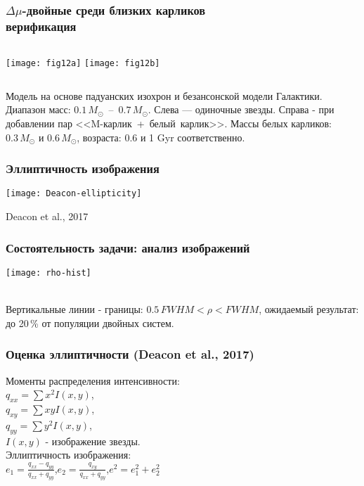 \begin{frame}
\frametitle{$\Delta\mu$-двойные среди близких карликов\\{\small верификация}}
\begin{center}
\begin{columns}
	\texttt{[image: fig12a]}
	\texttt{[image: fig12b]}
\end{columns}
\end{center}
{\footnotesize
	Модель на основе падуанских изохрон и безансонской модели Галактики. Диапазон масс: $0.1\,M_{\odot}$~--~$0.7\,M_{\odot}$. Слева --- одиночные звезды. Справа - при добавлении пар <<M-карлик~+~белый~карлик>>. Массы белых карликов: $0.3\,M_{\odot}$ и $0.6\,M_{\odot}$, возраста: 0.6 и 1 Gyr соответственно.
}
\end{frame}





\begin{frame}
\frametitle{Эллиптичность изображения}
\begin{center}
	\texttt{[image: Deacon-ellipticity]}
\end{center}
{\footnotesize
	Deacon et al., 2017
}
\end{frame}

\begin{frame}%
\frametitle{Состоятельность задачи: {\small анализ изображений}}
\begin{center}
\texttt{[image: rho-hist]}
\end{center}
\begin{center}
{\footnotesize \\ Вертикальные линии - границы: $0.5\,FWHM<\rho<FWHM$, ожидаемый результат: до 20\,\% от популяции двойных систем.}
\end{center}
\end{frame}

\begin{frame}
\frametitle{Оценка эллиптичности (Deacon et al., 2017)}
	Моменты распределения интенсивности:\\[5pt]
	$q_{xx}=\sum x^2 I(x,y)$,\\ $q_{xy}=\sum xy I(x,y)$,\\ $q_{yy}=\sum y^2 I(x,y)$,\\[10pt]
	$I(x,y)$ - изображение звезды.\\[15pt]
	Эллиптичность изображения:\\[5pt]
	$e_1 = \frac{q_{xx}-q_{yy}}{q_{xx}+q_{yy}}$,\qquad $e_2 = \frac{q_{xy}}{q_{xx}+q_{yy}}$,\qquad $e^2=e^2_1+e^2_2$
\end{frame}

